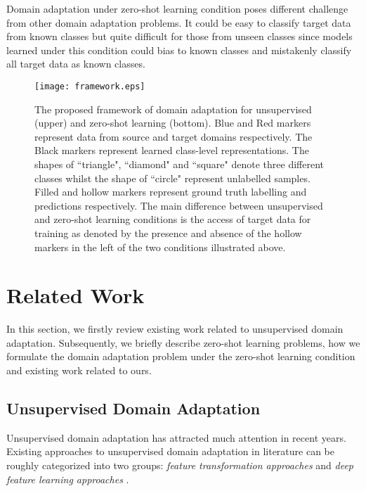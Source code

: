\documentclass[conference]{IEEEtran}
\begin{document}
Domain adaptation under zero-shot learning condition poses different challenge from other domain adaptation problems. It could be easy to classify target data from known classes but quite difficult for those from unseen classes since models learned under this condition could bias to known classes and mistakenly classify all target data as known classes.
\begin{figure}
	\centering
	{\texttt{[image: framework.eps]}}
	{\caption{The proposed framework of domain adaptation for unsupervised (upper) and zero-shot learning (bottom).
			\newline
			{\color{blue}Blue} and {\color{red}Red} markers represent data from source and target domains respectively. The Black markers represent learned class-level representations. The shapes of ``triangle", ``diamond" and ``square" denote three different classes whilst the shape of ``circle" represent unlabelled samples. Filled and hollow markers represent ground truth labelling and predictions respectively. The main difference between unsupervised and zero-shot learning conditions is the access of target data for training as denoted by the presence and absence of the hollow markers in the left of the two conditions illustrated above.
			}
		\label{figure_framework}}
\end{figure}


\section{Related Work}\label{sec:related}
In this section, we firstly review existing work related to unsupervised domain adaptation. Subsequently, we briefly describe zero-shot learning problems, how we formulate the domain adaptation problem under the zero-shot learning condition and existing work related to ours.
\subsection{Unsupervised Domain Adaptation}
Unsupervised domain adaptation has attracted much attention in recent years. Existing approaches to unsupervised domain adaptation in literature can be roughly categorized into two groups: \textit{feature transformation approaches} \cite{long2013transfer, long2014transfer, sun2016return, zhang2017joint, ghifary2017scatter, sun2017correlation, wang2018visual} and \textit{deep feature learning approaches} \cite{ganin2015unsupervised, long2015learning, ganin2016domain, long2016unsupervised, long2017deep, chen2018joint, pei2018multi, zhang2018collaborative, long2018conditional}. 
\end{document}
